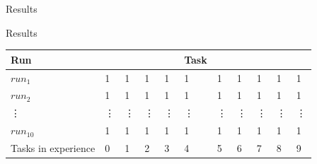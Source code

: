 \begin{frame}[fragile]{Results} 
\begin{figure}
  \centering
  \quad
\end{figure}
\end{frame}


\begin{frame}[fragile]{Results} 
\begin{table}[H]
    \centering
    \begin{tabular}%
    {l | p{0.3cm} p{0.3cm} p{0.3cm} p{0.3cm} p{0.3cm} p{0.3cm} p{0.3cm} p{0.3cm}p{0.3cm} p{0.3cm}}
  Run &  &   &  &  & Task &  &  &  &  & \\ \hline
  $\mathit{run}_1$ & 1 & 1  & 1 & 1 & 1 & 1 & 1 & 1 & 1 & 1\\
  $\mathit{run}_2$ & 1 & 1  & 1 & 1 & 1 & 1 & 1 & 1 & 1 & 1\\
  \quad\vdots &\vdots & \vdots  & \vdots & \vdots & \vdots & \vdots & \vdots & \vdots & \vdots & \vdots\\
  $\mathit{run}_{10}$ & 1 & 1  & 1 & 1 & 1 & 1 & 1 & 1 & 1 & 1\\\hline
    Tasks in experience & 0 & 1 & 2 & 3 &4 & 5 &6 & 7& 8  &9\\ 
    \end{tabular}
\end{table}


\end{frame}

